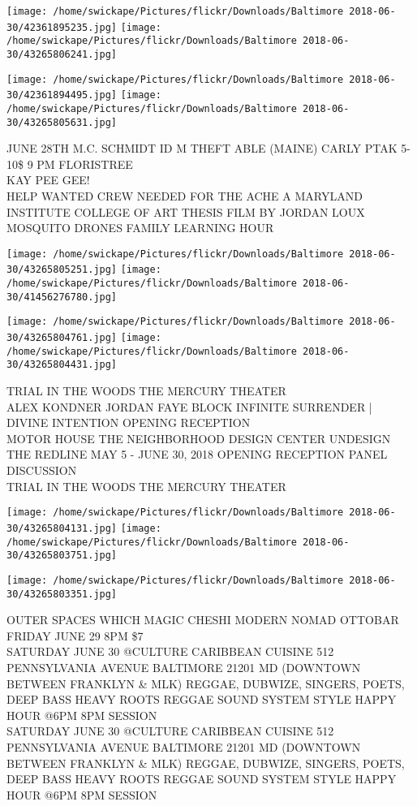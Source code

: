 \documentclass[10pt,letterpaper]{article}
\begin{document}
\texttt{[image: /home/swickape/Pictures/flickr/Downloads/Baltimore 2018-06-30/42361895235.jpg]}
\texttt{[image: /home/swickape/Pictures/flickr/Downloads/Baltimore 2018-06-30/43265806241.jpg]}

\texttt{[image: /home/swickape/Pictures/flickr/Downloads/Baltimore 2018-06-30/42361894495.jpg]}
\texttt{[image: /home/swickape/Pictures/flickr/Downloads/Baltimore 2018-06-30/43265805631.jpg]}

JUNE 28TH M.C. SCHMIDT ID M THEFT ABLE (MAINE) CARLY PTAK 5{-}10\$ 9 PM FLORISTREE\\
KAY PEE GEE!\\
HELP WANTED CREW NEEDED FOR THE ACHE A MARYLAND INSTITUTE COLLEGE OF ART THESIS FILM BY JORDAN LOUX\\
MOSQUITO DRONES FAMILY LEARNING HOUR\\
\pagebreak

\texttt{[image: /home/swickape/Pictures/flickr/Downloads/Baltimore 2018-06-30/43265805251.jpg]}
\texttt{[image: /home/swickape/Pictures/flickr/Downloads/Baltimore 2018-06-30/41456276780.jpg]}

\texttt{[image: /home/swickape/Pictures/flickr/Downloads/Baltimore 2018-06-30/43265804761.jpg]}
\texttt{[image: /home/swickape/Pictures/flickr/Downloads/Baltimore 2018-06-30/43265804431.jpg]}

TRIAL IN THE WOODS THE MERCURY THEATER\\
ALEX KONDNER JORDAN FAYE BLOCK INFINITE SURRENDER | DIVINE INTENTION OPENING RECEPTION\\
MOTOR HOUSE THE NEIGHBORHOOD DESIGN CENTER UNDESIGN THE REDLINE MAY 5 {-} JUNE 30, 2018 OPENING RECEPTION PANEL DISCUSSION\\
TRIAL IN THE WOODS THE MERCURY THEATER\\
\pagebreak

\texttt{[image: /home/swickape/Pictures/flickr/Downloads/Baltimore 2018-06-30/43265804131.jpg]}
\texttt{[image: /home/swickape/Pictures/flickr/Downloads/Baltimore 2018-06-30/43265803751.jpg]}

\texttt{[image: /home/swickape/Pictures/flickr/Downloads/Baltimore 2018-06-30/43265803351.jpg]}

OUTER SPACES WHICH MAGIC CHESHI MODERN NOMAD OTTOBAR FRIDAY JUNE 29 8PM \$7\\
SATURDAY JUNE 30 @CULTURE CARIBBEAN CUISINE 512 PENNSYLVANIA AVENUE BALTIMORE 21201 MD (DOWNTOWN BETWEEN FRANKLYN \& MLK) REGGAE, DUBWIZE, SINGERS, POETS, DEEP BASS HEAVY ROOTS REGGAE SOUND SYSTEM STYLE HAPPY HOUR @6PM 8PM SESSION\\
SATURDAY JUNE 30 @CULTURE CARIBBEAN CUISINE 512 PENNSYLVANIA AVENUE BALTIMORE 21201 MD (DOWNTOWN BETWEEN FRANKLYN \& MLK) REGGAE, DUBWIZE, SINGERS, POETS, DEEP BASS HEAVY ROOTS REGGAE SOUND SYSTEM STYLE HAPPY HOUR @6PM 8PM SESSION\\
\pagebreak
\end{document}
